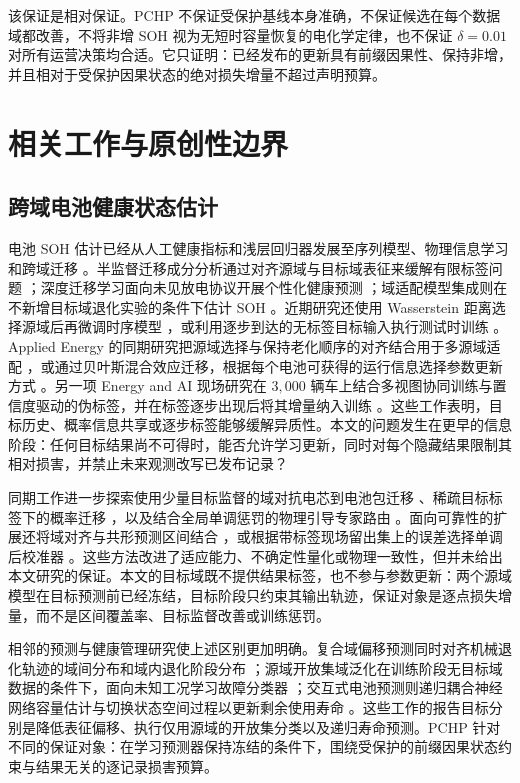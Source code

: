 \documentclass[UTF8,11pt]{ctexart}
\begin{document}
该保证是相对保证。PCHP 不保证受保护基线本身准确，不保证候选在每个数据域都改善，不将非增 SOH 视为无短时容量恢复的电化学定律，也不保证 $\delta=0.01$ 对所有运营决策均合适。它只证明：已经发布的更新具有前缀因果性、保持非增，并且相对于受保护因果状态的绝对损失增量不超过声明预算。

\section{相关工作与原创性边界}

\subsection{跨域电池健康状态估计}

电池 SOH 估计已经从人工健康指标和浅层回归器发展至序列模型、物理信息学习和跨域迁移 \citep{ng2020mlbattery,roman2021pipeline,wang2024pinn}。半监督迁移成分分析通过对齐源域与目标域表征来缓解有限标签问题 \citep{li2020sstca}；深度迁移学习面向未见放电协议开展个性化健康预测 \citep{ma2022personalized}；域适配模型集成则在不新增目标域退化实验的条件下估计 SOH \citep{lu2023without}。近期研究还使用 Wasserstein 距离选择源域后再微调时序模型 \citep{duan2025wasserstein}，或利用逐步到达的无标签目标输入执行测试时训练 \citep{feng2024batteryttt}。Applied Energy 的同期研究把源域选择与保持老化顺序的对齐结合用于多源域适配 \citep{qiu2024multisource}，或通过贝叶斯混合效应迁移，根据每个电池可获得的运行信息选择参数更新方式 \citep{zhang2025bayesian}。另一项 Energy and AI 现场研究在 $3{,}000$ 辆车上结合多视图协同训练与置信度驱动的伪标签，并在标签逐步出现后将其增量纳入训练 \citep{hadzalic2025field}。这些工作表明，目标历史、概率信息共享或逐步标签能够缓解异质性。本文的问题发生在更早的信息阶段：任何目标结果尚不可得时，能否允许学习更新，同时对每个隐藏结果限制其相对损害，并禁止未来观测改写已发布记录？

同期工作进一步探索使用少量目标监督的域对抗电芯到电池包迁移 \citep{shu2026celltopack}、稀疏目标标签下的概率迁移 \citep{shao2026probabilistic}，以及结合全局单调惩罚的物理引导专家路由 \citep{jiang2026phasemoe}。面向可靠性的扩展还将域对齐与共形预测区间结合 \citep{filgueira2026conformalized}，或根据带标签现场留出集上的误差选择单调后校准器 \citep{nyachionjeka2026safecalibrated}。这些方法改进了适应能力、不确定性量化或物理一致性，但并未给出本文研究的保证。本文的目标域既不提供结果标签，也不参与参数更新：两个源域模型在目标预测前已经冻结，目标阶段只约束其输出轨迹，保证对象是逐点损失增量，而不是区间覆盖率、目标监督改善或训练惩罚。

相邻的预测与健康管理研究使上述区别更加明确。复合域偏移预测同时对齐机械退化轨迹的域间分布和域内退化阶段分布 \citep{ding2023compound}；源域开放集域泛化在训练阶段无目标域数据的条件下，面向未知工况学习故障分类器 \citep{song2026regroupment}；交互式电池预测则递归耦合神经网络容量估计与切换状态空间过程以更新剩余使用寿命 \citep{duan2025interactive}。这些工作的报告目标分别是降低表征偏移、执行仅用源域的开放集分类以及递归寿命预测。PCHP 针对不同的保证对象：在学习预测器保持冻结的条件下，围绕受保护的前缀因果状态约束与结果无关的逐记录损害预算。
\end{document}

